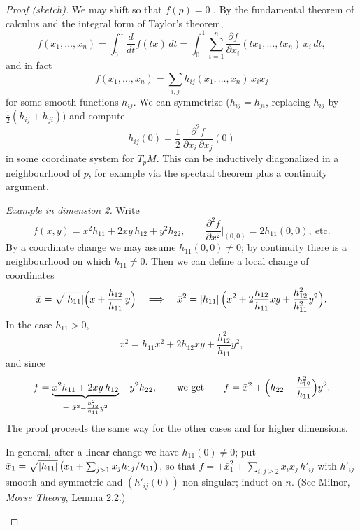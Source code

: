 \begin{proof}[Proof (sketch)]
We may shift so that $f(p)=0$ . By the fundamental theorem of
calculus and the integral form of Taylor's theorem,
\[
  f(x_1,\dots,x_n)=\int_0^1 \frac{d}{dt}f(tx)\,dt
  =\int_0^1\sum_{i=1}^n \frac{\partial f}{\partial x_i}(tx_1,\dots,tx_n)\,x_i\,dt ,
\]
and in fact
\[
  f(x_1,\dots,x_n)=\sum_{i,j} h_{ij}(x_1,\dots,x_n)\,x_ix_j
\]
for some smooth functions $h_{ij}$. We can symmetrize ($h_{ij}=h_{ji}$, replacing $h_{ij}$
by $\tfrac12(h_{ij}+h_{ji})$) and compute
\[
  h_{ij}(0)=\frac12\,\frac{\partial^2 f}{\partial x_i\,\partial x_j}(0)
\]
in some coordinate system for $T_pM$.
This can be inductively diagonalized in a neighbourhood of $p$, for example via the
spectral theorem plus a continuity argument.

\emph{Example in dimension 2.} Write
\[
  f(x,y)=x^2h_{11}+2xy\,h_{12}+y^2h_{22},
  \qquad \frac{\partial^2 f}{\partial x^2}\Big|_{(0,0)}=2h_{11}(0,0),\ \text{etc.}
\]
By a  coordinate change we may assume $h_{11}(0,0)\neq0$; by continuity there is
a neighbourhood on which $h_{11}\neq0$. Then we can define a local change of coordinates
\[
  \bar x=\sqrt{\left\lvert h_{11} \right\rvert}\Bigl(x+\frac{h_{12}}{h_{11}}\,y\Bigr)
  \quad\Longrightarrow\quad
  \bar x^2=\left\lvert h_{11} \right\rvert\Bigl(x^2+2\frac{h_{12}}{h_{11}}xy+\frac{h_{12}^2}{h_{11}^2}y^2\Bigr).
\]
In the case $h_{11}>0$,
\[
  \bar x^2=h_{11}x^2+2h_{12}xy+\frac{h_{12}^2}{h_{11}}y^2 ,
\]
and since
\[
  f=\underbrace{x^2h_{11}+2xy\,h_{12}}_{=\ \bar x^2-\frac{h_{12}^2}{h_{11}}y^2}+\,y^2h_{22},
  \qquad\text{we get}\qquad
  f=\bar x^2+\Bigl(h_{22}-\frac{h_{12}^2}{h_{11}}\Bigr)y^2 .
\]
The proof proceeds the same way for the other cases and for higher dimensions.
\begin{addedblock}
In general, after a linear change we have $h_{11}(0)\ne0$; put
$\bar x_1=\sqrt{\left\lvert h_{11} \right\rvert}\,\bigl(x_1+\sum_{j>1}x_jh_{1j}/h_{11}\bigr)$, so that
$f=\pm\bar x_1^2+\sum_{i,j\ge2}x_ix_j\,h'_{ij}$ with $h'_{ij}$ smooth and symmetric and
$(h'_{ij}(0))$ non-singular; induct on $n$. (See Milnor, \emph{Morse Theory}, Lemma 2.2.)
\end{addedblock}
\end{proof}

